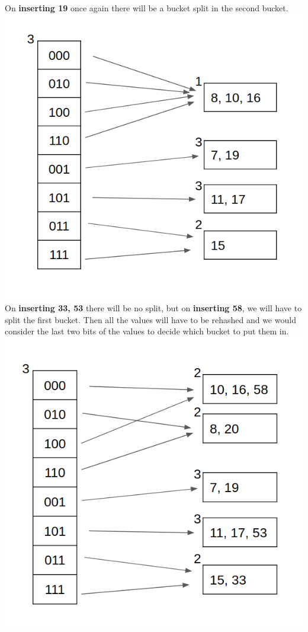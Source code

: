 \documentclass[12pt]{article}
\begin{document}
\begin{enumerate}
On \textbf{inserting 19} once again there will be a bucket split in the second bucket.\\
\includegraphics[scale=0.48]{55.png}\\
On \textbf{inserting 33, 53} there will be no split, but on \textbf{inserting 58}, we will have to split the first bucket. Then all the values will have to be rehashed and we would consider the last two bits of the values to decide which bucket to put them in.\\
\includegraphics[scale=0.5]{56.png}
\end{enumerate}
\end{document}
